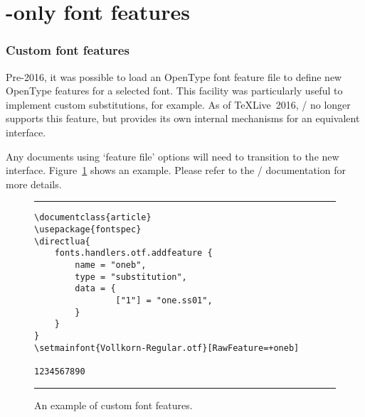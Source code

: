 
\part{\LuaTeX-only font features}
\label{sec:luatex-features}

\section{Custom font features}

Pre-2016, it was possible to load an OpenType font feature file to define new OpenType features for a selected font. This facility was particularly useful to implement custom substitutions, for example.  As of \TeX{}Live~2016, \LuaTeX/ no longer supports this feature, but provides its own internal mechanisms for an equivalent interface.

Any documents using `feature file' options will need to transition to the new interface.
Figure~\ref{fig:featurefile} shows an example.
Please refer to the \LuaTeX/ documentation for more details.

\begin{figure}
\caption{An example of custom font features.}
\label{fig:featurefile}
\hrule
\begin{Verbatim}
\documentclass{article}
\usepackage{fontspec}
\directlua{
    fonts.handlers.otf.addfeature {
        name = "oneb",
        type = "substitution",
        data = {
                ["1"] = "one.ss01",
        }
    }
}
\setmainfont{Vollkorn-Regular.otf}[RawFeature=+oneb]

1234567890

\end{Verbatim}
\hrule
\end{figure}





